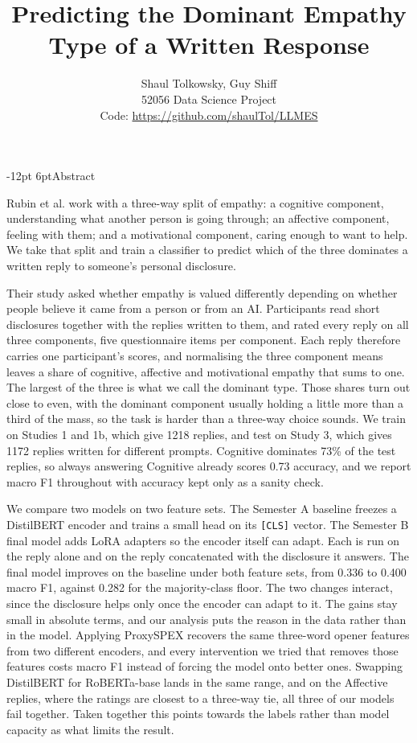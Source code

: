 \documentclass[11pt,a4paper]{article}
\title{\vspace{-1.2cm}\Large Predicting the Dominant Empathy Type of a Written Response}
\author{\normalsize Shaul Tolkowsky, Guy Shiff \\[2pt] \normalsize 52056 Data Science Project
\\[2pt] \small Code: \url{https://github.com/shaulTol/LLMES}}
\date{}
\makeatletter
\renewcommand\section{\@startsection{section}{1}{\z@}%
  {-12pt \@plus -3pt \@minus -2pt}{6pt}{\normalfont\large\bfseries}}
\makeatother
\begin{document}
\maketitle
\vspace{-1.0cm}

\section{Abstract}

Rubin et al. \cite{rubin2025} work with a three-way split of empathy: a cognitive
component, understanding what another person is going through; an affective component,
feeling with them; and a motivational component, caring enough to want to help. We take
that split and train a classifier to predict which of the three dominates a written reply
to someone's personal disclosure.

Their study asked whether empathy is valued differently depending on whether people believe
it came from a person or from an AI. Participants read short disclosures together with the
replies written to them, and rated every reply on all three components, five questionnaire
items per component. Each reply therefore carries one participant's scores, and normalising
the three component means leaves a share of cognitive, affective and motivational empathy
that sums to one. The largest of the three is what we call the dominant type. Those shares turn out close to even, with the dominant component
usually holding a little more than a third of the mass, so the task is harder than a
three-way choice sounds. We train on Studies 1 and 1b, which give 1218 replies, and test on
Study 3, which gives 1172 replies written for different prompts. Cognitive dominates 73\% of
the test replies, so always answering Cognitive already scores 0.73 accuracy, and we report
macro F1 throughout with accuracy kept only as a sanity check.

We compare two models on two feature sets. The Semester A baseline freezes a DistilBERT
encoder and trains a small head on its \texttt{[CLS]} vector. The Semester B final model
adds LoRA adapters so the encoder itself can adapt. Each is run on the reply alone and on
the reply concatenated with the disclosure it answers. The final model improves on the
baseline under both feature sets, from 0.336 to 0.400 macro F1, against 0.282 for the
majority-class floor. The two changes interact, since the
disclosure helps only once the encoder can adapt to it. The gains stay small in absolute
terms, and our analysis puts the reason in the data rather than in the model. Applying
ProxySPEX \cite{proxyspex} recovers the same three-word opener features from two different
encoders, and every intervention we tried that removes those features costs macro F1 instead
of forcing the model onto better ones. Swapping DistilBERT for RoBERTa-base lands in the same
range, and on the Affective replies, where the ratings are closest to a three-way tie, all
three of our models fail together. Taken together this points towards the labels rather than
model capacity as what limits the result.
\end{document}
